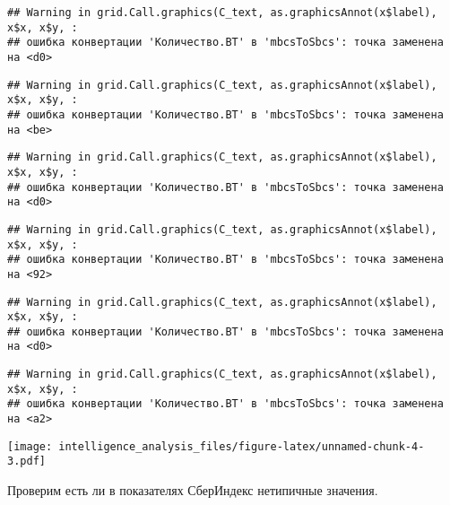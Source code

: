 \documentclass[
]{article}
\begin{document}
\begin{verbatim}
## Warning in grid.Call.graphics(C_text, as.graphicsAnnot(x$label), x$x, x$y, :
## ошибка конвертации 'Количество.ВТ' в 'mbcsToSbcs': точка заменена на <d0>
\end{verbatim}

\begin{verbatim}
## Warning in grid.Call.graphics(C_text, as.graphicsAnnot(x$label), x$x, x$y, :
## ошибка конвертации 'Количество.ВТ' в 'mbcsToSbcs': точка заменена на <be>
\end{verbatim}

\begin{verbatim}
## Warning in grid.Call.graphics(C_text, as.graphicsAnnot(x$label), x$x, x$y, :
## ошибка конвертации 'Количество.ВТ' в 'mbcsToSbcs': точка заменена на <d0>
\end{verbatim}

\begin{verbatim}
## Warning in grid.Call.graphics(C_text, as.graphicsAnnot(x$label), x$x, x$y, :
## ошибка конвертации 'Количество.ВТ' в 'mbcsToSbcs': точка заменена на <92>
\end{verbatim}

\begin{verbatim}
## Warning in grid.Call.graphics(C_text, as.graphicsAnnot(x$label), x$x, x$y, :
## ошибка конвертации 'Количество.ВТ' в 'mbcsToSbcs': точка заменена на <d0>
\end{verbatim}

\begin{verbatim}
## Warning in grid.Call.graphics(C_text, as.graphicsAnnot(x$label), x$x, x$y, :
## ошибка конвертации 'Количество.ВТ' в 'mbcsToSbcs': точка заменена на <a2>
\end{verbatim}

\texttt{[image: intelligence\_analysis\_files/figure-latex/unnamed-chunk-4-3.pdf]}

Проверим есть ли в показателях СберИндекс нетипичные значения.
\end{document}
